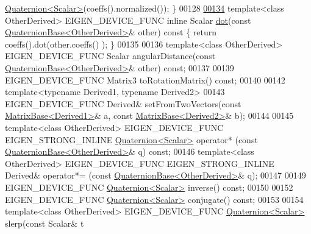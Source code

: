 \begin{DoxyCode}
      \hyperlink{group___geometry___module_class_eigen_1_1_quaternion}{Quaternion<Scalar>}(coeffs().normalized()); \}
00128 
\hyperlink{group___geometry___module_aa95c422b3d12869ed6aa46e4dd5a430a}{00134}   \textcolor{keyword}{template}<\textcolor{keyword}{class} OtherDerived> EIGEN\_DEVICE\_FUNC \textcolor{keyword}{inline} Scalar \hyperlink{group___geometry___module_aa95c422b3d12869ed6aa46e4dd5a430a}{dot}(\textcolor{keyword}{const} 
      \hyperlink{group___geometry___module_class_eigen_1_1_quaternion_base}{QuaternionBase<OtherDerived>}& other)\textcolor{keyword}{ const }\{ \textcolor{keywordflow}{return} coeffs().dot(other.coeffs()
      ); \}
00135 
00136   \textcolor{keyword}{template}<\textcolor{keyword}{class} OtherDerived> EIGEN\_DEVICE\_FUNC Scalar angularDistance(\textcolor{keyword}{const} 
      \hyperlink{group___geometry___module_class_eigen_1_1_quaternion_base}{QuaternionBase<OtherDerived>}& other) \textcolor{keyword}{const};
00137 
00139   EIGEN\_DEVICE\_FUNC Matrix3 toRotationMatrix() \textcolor{keyword}{const};
00140 
00142   \textcolor{keyword}{template}<\textcolor{keyword}{typename} Derived1, \textcolor{keyword}{typename} Derived2>
00143   EIGEN\_DEVICE\_FUNC Derived& setFromTwoVectors(\textcolor{keyword}{const} \hyperlink{group___core___module_class_eigen_1_1_matrix_base}{MatrixBase<Derived1>}& a, \textcolor{keyword}{const} 
      \hyperlink{group___core___module_class_eigen_1_1_matrix_base}{MatrixBase<Derived2>}& b);
00144 
00145   \textcolor{keyword}{template}<\textcolor{keyword}{class} OtherDerived> EIGEN\_DEVICE\_FUNC EIGEN\_STRONG\_INLINE 
      \hyperlink{group___geometry___module_class_eigen_1_1_quaternion}{Quaternion<Scalar>} operator* (\textcolor{keyword}{const} 
      \hyperlink{group___geometry___module_class_eigen_1_1_quaternion_base}{QuaternionBase<OtherDerived>}& q) \textcolor{keyword}{const};
00146   \textcolor{keyword}{template}<\textcolor{keyword}{class} OtherDerived> EIGEN\_DEVICE\_FUNC EIGEN\_STRONG\_INLINE Derived& operator*= (\textcolor{keyword}{const} 
      \hyperlink{group___geometry___module_class_eigen_1_1_quaternion_base}{QuaternionBase<OtherDerived>}& q);
00147 
00149   EIGEN\_DEVICE\_FUNC \hyperlink{group___geometry___module_class_eigen_1_1_quaternion}{Quaternion<Scalar>} inverse() \textcolor{keyword}{const};
00150 
00152   EIGEN\_DEVICE\_FUNC \hyperlink{group___geometry___module_class_eigen_1_1_quaternion}{Quaternion<Scalar>} conjugate() \textcolor{keyword}{const};
00153 
00154   \textcolor{keyword}{template}<\textcolor{keyword}{class} OtherDerived> EIGEN\_DEVICE\_FUNC \hyperlink{group___geometry___module_class_eigen_1_1_quaternion}{Quaternion<Scalar>} slerp(\textcolor{keyword}{const} Scalar& t

\end{DoxyCode}
